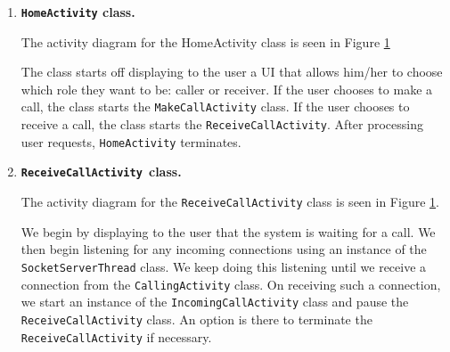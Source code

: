 \documentclass[12pt,svgnames,smaller]{article} %
\begin{document}
	\begin{enumerate}

		\begin{figure}
			\centering
			\begin{minipage}{0.5\textwidth}
				\centering
				\texttt{[image: "/run/media/joshua/DATA/ICS\_2406\_Pictures/02SystemAnalysisAndDesign/Activity\_Diagram\_-\_HomeActivity"]}
			\end{minipage}%
			\begin{minipage}{0.5\textwidth}
				\centering
				\texttt{[image: "/run/media/joshua/DATA/ICS\_2406\_Pictures/02SystemAnalysisAndDesign/Activity\_Diagram\_-\_RecieveCallActivity"]}	
			\end{minipage}
			\caption{Activity Diagram for \texttt{HomeActivity} on the left and \texttt{ReceiveCallActivity} on the right}
			\label{fig:SystemAnalysisandDesign-Activity_Diagram_-_HomeActivity,_ReceiveCallActivity}		
		\end{figure}

		\item \textbf{\texttt{HomeActivity} class.} 
		
		The activity diagram for the HomeActivity class is seen in Figure \ref{fig:SystemAnalysisandDesign-Activity_Diagram_-_HomeActivity,_ReceiveCallActivity}
		
		The class starts off displaying to the user a UI that allows him/her to choose which role they want to be: caller or receiver. If the user chooses to make a call, the class starts the \texttt{MakeCallActivity} class. If the user chooses to receive a call, the class starts the \texttt{ReceiveCallActivity}. After processing user requests, \texttt{HomeActivity} terminates.
		
		\item \textbf{\texttt{ReceiveCallActivity }class. }

		The activity diagram for the \texttt{ReceiveCallActivity} class is seen in Figure \ref{fig:SystemAnalysisandDesign-Activity_Diagram_-_HomeActivity,_ReceiveCallActivity}.

		We begin by displaying to the user that the system is waiting for a call. We then begin listening for any incoming connections using an instance of the \texttt{SocketServerThread} class. We keep doing this listening until we receive a connection from the \texttt{CallingActivity} class. On receiving such a connection, we start an instance of the \texttt{IncomingCallActivity} class and pause the \texttt{ReceiveCallActivity} class. An option is there to terminate the \texttt{ReceiveCallActivity} if necessary.
		

\end{enumerate}
\end{document}
